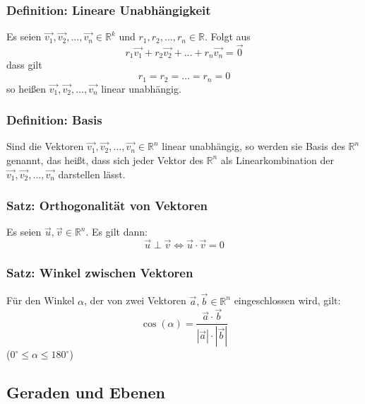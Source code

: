 \documentclass{article}
\begin{document}
  \subsubsection{Definition: Lineare Unabhängigkeit}
  Es seien $\vec{v_1}, \vec{v_2}, \ldots, \vec{v_n} \in \mathbb{R}^k$ und $r_1, r_2, \ldots, r_n \in \mathbb{R}$. Folgt aus 
  \begin{equation*}
  	r_1 \vec{v_1} + r_2 \vec{v_2} + \ldots + r_n \vec{v_n} = \vec{0}
  \end{equation*}
  dass gilt
  \begin{equation*}
  	r_1 = r_2 = \ldots = r_n = 0
  \end{equation*}
  so heißen $\vec{v_1}, \vec{v_2}, \ldots, \vec{v_n}$ linear unabhängig.
  
  \subsubsection{Definition: Basis}
  Sind die Vektoren $\vec{v_1}, \vec{v_2}, \ldots, \vec{v_n} \in \mathbb{R}^n$ linear unabhängig, so werden sie Basis des $\mathbb{R}^n$ genannt, das heißt, dass sich jeder Vektor des $\mathbb{R}^n$ als Linearkombination der $\vec{v_1}, \vec{v_2}, \ldots, \vec{v_n}$ darstellen lässt.
  
  \subsubsection{Satz: Orthogonalität von Vektoren}
  Es seien $\vec{u}, \vec{v} \in \mathbb{R}^n$. Es gilt dann: 
  \begin{equation*}
  	\vec{u} \perp \vec{v} \Leftrightarrow \vec{u} \cdot \vec{v} = 0
  \end{equation*}
  
  \subsubsection{Satz: Winkel zwischen Vektoren}
  Für den Winkel $\alpha$, der von zwei Vektoren $\vec{a}, \vec{b} \in \mathbb{R}^n$ eingeschlossen wird, gilt: 
  \begin{equation*}
  	\cos(\alpha) = \frac{\vec{a} \cdot \vec{b}}{|\vec{a}| \cdot |\vec{b}|}
  \end{equation*}
  ($0^{\circ} \leqslant \alpha \leqslant 180^{\circ}$)
  
  \subsection{Geraden und Ebenen}
  
\end{document}
